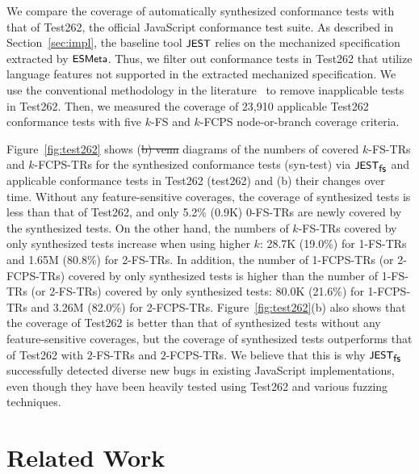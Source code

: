 \documentclass[acmsmall,review,screen]{acmart}
\newcommand{\name}[1]{\textsf{#1}}
\newcommand{\sname}[1]{\name{\small #1}}
\newcommand{\jest}{\sname{JEST}}
\newcommand{\esmeta}{\sname{ESMeta}}
\newcommand{\tool}{\jest_{\sname{fs}}}
\providecommand{\DIFaddtex}[1]{{\protect\color{blue}\uwave{#1}}} %
\providecommand{\DIFdeltex}[1]{{\protect\color{red}\sout{#1}}}                      %
\providecommand{\DIFaddbegin}{} %
\providecommand{\DIFaddend}{} %
\providecommand{\DIFdelbegin}{} %
\providecommand{\DIFdelend}{} %
\providecommand{\DIFadd}[1]{\texorpdfstring{\DIFaddtex{#1}}{#1}} %
\providecommand{\DIFdel}[1]{\texorpdfstring{\DIFdeltex{#1}}{}} %
\newcommand{\DIFscaledelfig}{0.5}
\newlength{\DIFdelgraphicswidth} %
\newlength{\DIFdelgraphicsheight} %
\newcommand{\DIFaddincludegraphics}[2][]{{\color{blue}\fbox{\DIFOincludegraphics[#1]{#2}}}} %
\newcommand{\DIFdelincludegraphics}[2][]{%
\sbox{\DIFdelgraphicsbox}{\DIFOincludegraphics[#1]{#2}}%
\settoboxwidth{\DIFdelgraphicswidth}{\DIFdelgraphicsbox} %
\settoboxtotalheight{\DIFdelgraphicsheight}{\DIFdelgraphicsbox} %
\scalebox{\DIFscaledelfig}{%
\parbox[b]{\DIFdelgraphicswidth}{\usebox{\DIFdelgraphicsbox}\\[-\baselineskip] \rule{\DIFdelgraphicswidth}{0em}}\llap{\resizebox{\DIFdelgraphicswidth}{\DIFdelgraphicsheight}{%
\setlength{\unitlength}{\DIFdelgraphicswidth}%
\begin{picture}(1,1)%
\thicklines\linethickness{2pt} %
{\color[rgb]{1,0,0}\put(0,0){\framebox(1,1){}}}%
{\color[rgb]{1,0,0}\put(0,0){\line( 1,1){1}}}%
{\color[rgb]{1,0,0}\put(0,1){\line(1,-1){1}}}%
\end{picture}%
}\hspace*{3pt}}} %
} %
\DeclareRobustCommand{\DIFaddbegin}{\DIFOaddbegin \let\includegraphics\DIFaddincludegraphics} %
\DeclareRobustCommand{\DIFaddend}{\DIFOaddend \let\includegraphics\DIFOincludegraphics} %
\DeclareRobustCommand{\DIFdelbegin}{\DIFOdelbegin \let\includegraphics\DIFdelincludegraphics} %
\DeclareRobustCommand{\DIFdelend}{\DIFOaddend \let\includegraphics\DIFOincludegraphics} %
\begin{document}

We compare the coverage of automatically synthesized conformance tests with that
of Test262, the official JavaScript conformance test suite.
As described in Section~\ref{sec:impl}, the baseline tool $\jest$ relies on the
mechanized specification extracted by $\esmeta$.
Thus, we filter out conformance tests in Test262 that utilize language
features not supported in the extracted mechanized specification.
We use the conventional methodology in the literature~\cite{kjs, jiset, javert}
to remove inapplicable tests in Test262.
Then, we measured the coverage of 23,910 applicable Test262 conformance tests
with five $k$-FS and $k$-FCPS node-or-branch coverage criteria.


Figure~\ref{fig:test262} shows
(\DIFdelbegin \DIFdel{b) venn }\DIFdelend \DIFaddbegin \DIFadd{a) Venn }\DIFaddend diagrams of
the numbers of covered $k$-FS-TRs and 
$k$-FCPS-TRs for the synthesized conformance tests (\sname{syn-test}) via
$\tool$ and applicable conformance tests in Test262 (\sname{test262}) and
(b) their changes over time.
Without any feature-sensitive coverages, the coverage of synthesized tests is
less than that of Test262, and only 5.2\% (0.9K) 0-FS-TRs are newly covered by
the synthesized tests.
%
On the other hand, the numbers of $k$-FS-TRs covered by only synthesized tests
increase when using higher $k$: 28.7K (19.0\%) for 1-FS-TRs and 1.65M (80.8\%)
for 2-FS-TRs.
%
In addition, the number of 1-FCPS-TRs (or 2-FCPS-TRs) covered by only
synthesized tests is higher than the number of 1-FS-TRs (or 2-FS-TRs)
covered by only synthesized tests:
80.0K (21.6\%) for 1-FCPS-TRs and 3.26M (82.0\%) for 2-FCPS-TRs.
Figure~\ref{fig:test262}(b) also shows that the coverage of Test262 is
better than that of synthesized tests without any feature-sensitive
coverages, but the coverage of synthesized tests outperforms that of
Test262 with $2$-FS-TRs and $2$-FCPS-TRs.
%
We believe that this is why $\tool$ successfully detected diverse new bugs in
existing JavaScript implementations, even though they have been heavily tested
using Test262 and various fuzzing techniques.

\section{Related Work}\label{sec:related}
\end{document}
